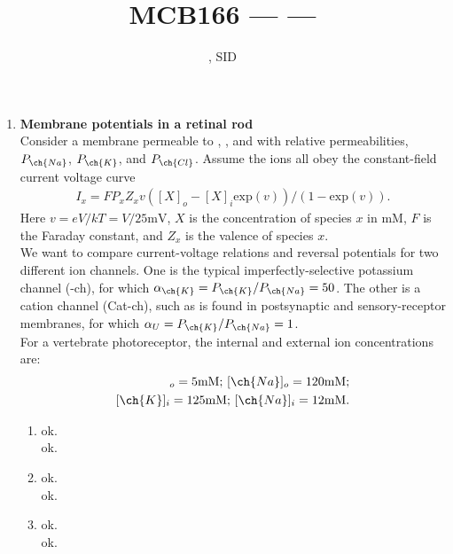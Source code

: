 \documentclass[11pt]{article}
\title{MCB166 --- \Session --- \Homework}
\author{\Name, SID \SID}
\date{\displaydate{date}}
\begin{document}
\maketitle

\newpage
\begin{enumerate}[label=\arabic*.]
\item
\textbf{Membrane potentials in a retinal rod}
\vspace*{1\baselineskip}
\\
Consider a membrane permeable to , , and  with relative permeabilities, $P_{\ch{Na}}$, $P_{\ch{K}}$, and $P_{\ch{Cl}}$. Assume the ions all obey the constant-field current voltage curve
\begin{align*}
I_x = F P_x Z_x v \left([X]_o - [X]_i \text{exp}(v)\right) / (1 - \text{exp}(v)).
\end{align*}
Here $v = eV / kT = V / 25 \text{mV}$, $X$ is the concentration of species $x$ in mM, $F$ is the Faraday constant, and $Z_x$ is the valence of species $x$.
\vspace*{1\baselineskip}
\\
We want to compare current-voltage relations and reversal potentials for two different ion channels. One is the typical imperfectly-selective potassium channel (-ch), for which $\alpha_{\ch{K}} = P_{\ch{K}} / P_{\ch{Na}} = 50$. The other is a cation channel (Cat-ch), such as is found in postsynaptic and sensory-receptor membranes, for which $\alpha_U = P_{\ch{K}} / P_{\ch{Na}} = 1$.
\vspace*{1\baselineskip}
\\
For a vertebrate photoreceptor, the internal and external ion concentrations are:
\begin{align*}
[\ch{K}]_o = 5 \text{mM; } [\ch{Na}]_o = 120 \text{mM;} \\
[\ch{K}]_i = 125 \text{mM; } [\ch{Na}]_i = 12 \text{mM.}
\end{align*}
\begin{enumerate}[label=(\alph*)]
\item
ok.
\vspace*{1\baselineskip}
\\
ok.



\item
ok.
\vspace*{1\baselineskip}
\\
ok.



\item
ok.
\vspace*{1\baselineskip}
\\
ok.




\end{enumerate}
\end{enumerate}
\end{document}
